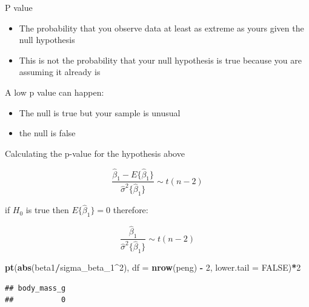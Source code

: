 \documentclass[
  ignorenonframetext,
]{beamer}
\newenvironment{Shaded}{\begin{snugshade}}{\end{snugshade}}
\newcommand{\DataTypeTok}[1]{\textcolor[rgb]{0.13,0.29,0.53}{#1}}
\newcommand{\DecValTok}[1]{\textcolor[rgb]{0.00,0.00,0.81}{#1}}
\newcommand{\KeywordTok}[1]{\textcolor[rgb]{0.13,0.29,0.53}{\textbf{#1}}}
\newcommand{\NormalTok}[1]{#1}
\newcommand{\OperatorTok}[1]{\textcolor[rgb]{0.81,0.36,0.00}{\textbf{#1}}}
\newcommand{\OtherTok}[1]{\textcolor[rgb]{0.56,0.35,0.01}{#1}}
\newcommand{\StringTok}[1]{\textcolor[rgb]{0.31,0.60,0.02}{#1}}
\providecommand{\tightlist}{%
  \setlength{\itemsep}{0pt}\setlength{\parskip}{0pt}}
\begin{document}
\begin{frame}{P value}
\protect\hypertarget{p-value}{}

\begin{itemize}
\tightlist
\item
  The probability that you observe data at least as extreme as yours
  given the null hypothesis
\item
  This is not the probability that your null hypothesis is true because
  you are assuming it already is
\end{itemize}

A low p value can happen:

\begin{itemize}
\tightlist
\item
  The null is true but your sample is unusual
\item
  the null is false
\end{itemize}

\end{frame}

\begin{frame}[fragile]{Calculating the p-value for the hypothesis above}
\protect\hypertarget{calculating-the-p-value-for-the-hypothesis-above}{}

\[
\frac{\hat\beta_1 - E\{\hat\beta_1\}}{\hat\sigma^2\{\hat\beta_1\}} \sim t(n-2) 
\]

if \(H_0\) is true then \(E\{\hat\beta_1\} = 0\) therefore:

\[
\frac{\hat\beta_1}{\hat\sigma^2\{\hat\beta_1\}} \sim t(n-2) 
\]

\begin{Shaded}
\begin{Highlighting}[]
\KeywordTok{pt}\NormalTok{(}\KeywordTok{abs}\NormalTok{(beta1}\OperatorTok{/}\NormalTok{sigma_beta_}\DecValTok{1}\OperatorTok{^}\DecValTok{2}\NormalTok{), }\DataTypeTok{df =} \KeywordTok{nrow}\NormalTok{(peng) }\OperatorTok{-}\StringTok{ }\DecValTok{2}\NormalTok{, }\DataTypeTok{lower.tail =} \OtherTok{FALSE}\NormalTok{)}\OperatorTok{*}\DecValTok{2}
\end{Highlighting}
\end{Shaded}

\begin{verbatim}
## body_mass_g 
##           0
\end{verbatim}

\end{frame}
\end{document}
